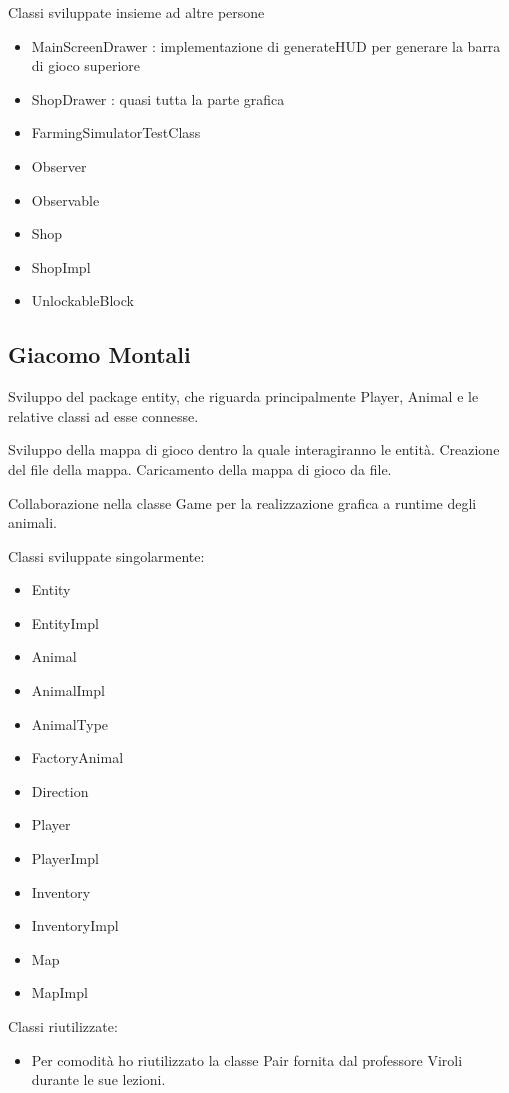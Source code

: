 \documentclass[a4paper,12pt]{report}
\begin{document}
Classi sviluppate insieme ad altre persone
{
\begin{itemize}
	\item MainScreenDrawer : implementazione di generateHUD per generare la barra di gioco superiore
	\item ShopDrawer : quasi tutta la parte grafica
	\item FarmingSimulatorTestClass 
	\item Observer
	\item Observable
	\item Shop
	\item ShopImpl
	\item UnlockableBlock
\end{itemize}
}

\subsection{Giacomo Montali}
Sviluppo del package entity, che riguarda principalmente Player, Animal e le relative classi ad esse connesse.

Sviluppo della mappa di gioco dentro la quale interagiranno le entità. Creazione del file della mappa. Caricamento della mappa di gioco da file. 

Collaborazione nella classe Game per la realizzazione grafica a runtime degli animali.

Classi sviluppate singolarmente:
{
\begin{itemize}
	\item Entity
	\item EntityImpl
	\item Animal
	\item AnimalImpl
	\item AnimalType
	\item FactoryAnimal
	\item Direction
	\item Player
	\item PlayerImpl
	\item Inventory
	\item InventoryImpl
	\item Map
	\item MapImpl
\end{itemize}
}
Classi riutilizzate:
\begin{itemize}
	\item Per comodità ho riutilizzato la classe Pair fornita dal professore Viroli durante le sue lezioni.
\end{itemize}
\end{document}
